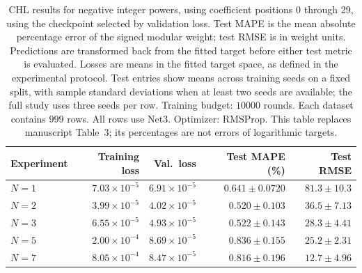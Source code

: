\begin{table}[!htbp]
\centering
\small
\setlength{\tabcolsep}{4pt}
\renewcommand{\arraystretch}{1.18}
\begin{tabular}{@{}lrrrr@{}}
\toprule
Experiment & Training loss & Val.\ loss & Test MAPE (\%) & Test RMSE \\
\midrule
$N=1$ & $7.03\times10^{-5}$ & $6.91\times10^{-5}$ & $0.641\pm0.0720$ & $81.3\pm10.3$ \\
$N=2$ & $3.99\times10^{-5}$ & $4.02\times10^{-5}$ & $0.520\pm0.103$ & $36.5\pm7.13$ \\
$N=3$ & $6.55\times10^{-5}$ & $4.93\times10^{-5}$ & $0.522\pm0.143$ & $28.3\pm4.41$ \\
$N=5$ & $2.00\times10^{-4}$ & $8.69\times10^{-5}$ & $0.836\pm0.155$ & $25.2\pm2.31$ \\
$N=7$ & $8.05\times10^{-4}$ & $8.47\times10^{-5}$ & $0.816\pm0.196$ & $12.7\pm4.96$ \\
\bottomrule
\end{tabular}
\caption{\textsf{CHL results for negative integer powers, using coefficient positions 0 through 29, using the checkpoint selected by validation loss. Test MAPE is the mean absolute percentage error of the signed modular weight; test RMSE is in weight units. Predictions are transformed back from the fitted target before either test metric is evaluated. Losses are means in the fitted target space, as defined in the experimental protocol. Test entries show means across training seeds on a fixed split, with sample standard deviations when at least two seeds are available; the full study uses three seeds per row. Training budget: $10000$ rounds. Each dataset contains $999$ rows. All rows use Net3. Optimizer: RMSProp. This table replaces manuscript Table~3; its percentages are not errors of logarithmic targets.}}
\label{tab:chl-revised-3-best}
\end{table}
